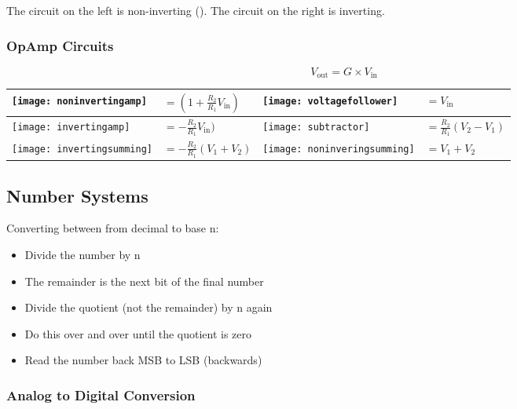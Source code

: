 \documentclass[12pt]{article}
\begin{document}
The circuit on the left is non-inverting ().
The circuit on the right is inverting. 
\subsubsection{OpAmp Circuits}
\begin{equation*}
  V_{\text{out}} = G \times V_{\text{in}}
\end{equation*}

\begin{table}[ht]
  \begin{tabular}{|m{4cm}|m{3cm}|m{4cm}|m{3cm}|}
    \hline
    \texttt{[image: noninvertingamp]} &
    $= ( 1 + \frac{R_2}{R_1}V_{\text{in}})$ &
    \texttt{[image: voltagefollower]} &
    $= V_{\text{in}}$ \\
    \hline
    \texttt{[image: invertingamp]} &
    $= -\frac{R_2}{R_1}V_{\text{in}})$ &
    \texttt{[image: subtractor]} &
    $= \frac{R_2}{R_1}(V_2 - V_1)$ \\
    \hline
    \texttt{[image: invertingsumming]} &
    $= -\frac{R_2}{R_1}(V_1+V_2)$ &
    \texttt{[image: noninveringsumming]} &
    $= V_1 + V_2$ \\
    \hline
  \end{tabular}
\end{table}

\subsection{Number Systems}
Converting between from decimal to base n:
\begin{itemize}
  \item Divide the number by n
  \item The remainder is the next bit of the final number
  \item Divide the quotient (not the remainder) by n again
  \item Do this over and over until the quotient is zero
  \item Read the number back MSB to LSB (backwards)
\end{itemize}

\subsubsection{Analog to Digital Conversion}
\end{document}
